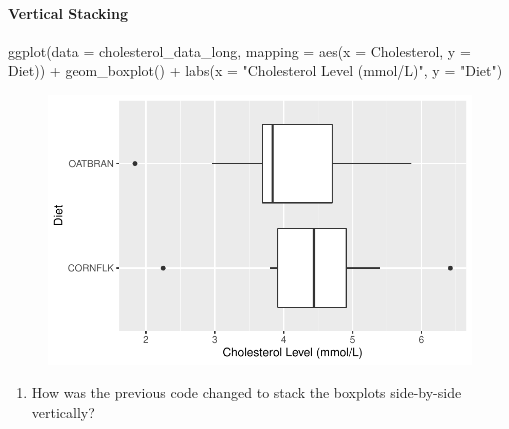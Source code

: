 \documentclass[
  letterpaper,
  DIV=11,
  numbers=noendperiod]{scrartcl}
\let\oldparagraph\paragraph
\renewcommand{\paragraph}[1]{\oldparagraph{#1}\mbox{}}
\newenvironment{Shaded}{\begin{snugshade}}{\end{snugshade}}
\newcommand{\AttributeTok}[1]{\textcolor[rgb]{0.40,0.45,0.13}{#1}}
\newcommand{\FunctionTok}[1]{\textcolor[rgb]{0.28,0.35,0.67}{#1}}
\newcommand{\NormalTok}[1]{\textcolor[rgb]{0.00,0.23,0.31}{#1}}
\newcommand{\SpecialCharTok}[1]{\textcolor[rgb]{0.37,0.37,0.37}{#1}}
\newcommand{\StringTok}[1]{\textcolor[rgb]{0.13,0.47,0.30}{#1}}
\providecommand{\tightlist}{%
  \setlength{\itemsep}{0pt}\setlength{\parskip}{0pt}}\usepackage{longtable,booktabs,array}
\begin{document}
\vspace{0.8in}

\newpage

\hypertarget{vertical-stacking}{%
\paragraph{Vertical Stacking}\label{vertical-stacking}}

\begin{Shaded}
\begin{Highlighting}[]
\FunctionTok{ggplot}\NormalTok{(}\AttributeTok{data =}\NormalTok{ cholesterol\_data\_long, }
       \AttributeTok{mapping =} \FunctionTok{aes}\NormalTok{(}\AttributeTok{x =}\NormalTok{ Cholesterol, }\AttributeTok{y =}\NormalTok{ Diet)) }\SpecialCharTok{+}
  \FunctionTok{geom\_boxplot}\NormalTok{() }\SpecialCharTok{+}
  \FunctionTok{labs}\NormalTok{(}\AttributeTok{x =} \StringTok{"Cholesterol Level (mmol/L)"}\NormalTok{, }
       \AttributeTok{y =} \StringTok{"Diet"}\NormalTok{)}
\end{Highlighting}
\end{Shaded}

\begin{figure}[H]

{\centering \includegraphics{activity5-cholesterol-I-key_files/figure-pdf/vertical-box-1.pdf}

}

\end{figure}

\begin{enumerate}
\def\labelenumi{\arabic{enumi}.}
\setcounter{enumi}{10}
\tightlist
\item
  How was the previous code changed to stack the boxplots side-by-side
  vertically?
\end{enumerate}
\end{document}
